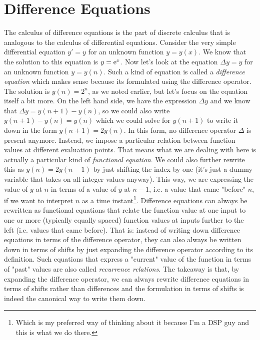 \section{Difference Equations}
The calculus of difference equations is the part of discrete calculus that is analogous to the calculus of differential equations. Consider the very simple differential equation $y' = y$ for an unknown function $y = y(x)$. We know that the solution to this equation is $y = \operatorname{\mathrm{e}}^x$. Now let's look at the equation $\Delta y = y$ for an unknown function $y = y(n)$. Such a kind of equation is called a \emph{difference equation} which makes sense because its formulated using the difference operator. The solution is $y(n) = 2^n$, as we noted earlier, but let's focus on the equation itself a bit more. On the left hand side, we have the expression $\Delta y$ and we know that $\Delta y = y(n+1) - y(n)$, so we could also write $y(n+1) - y(n) = y(n)$ which we could solve for $y(n+1)$ to write it down in the form $y(n+1) = 2 y(n)$. In this form, no difference operator $\Delta$ is present anymore. Instead, we impose a particular relation between function values at different evaluation points. That means what we are dealing with here is actually a particular kind of \emph{functional equation}.  We could also further rewrite this as $y(n) = 2 y(n-1)$ by just shifting the index by one (it's just a dummy variable that takes on all integer values anyway). This way, we are expressing the value of $y$ at $n$ in terms of a value of $y$ at $n-1$, i.e. a value that came "before" $n$, if we want to interpret $n$ as a time instant\footnote{Which is my preferred way of thinking about it because I'm a DSP guy and this is what we do there.}. Difference equations can always be rewritten as functional equations that relate the function value at one input to one or more (typically equally spaced) function values at inputs further to the left (i.e. values that came before). That is: instead of writing down difference equations in terms of the difference operator, they can also always be written down in terms of shifts by just expanding the difference operator according to its definition. Such equations that express a "current" value of the function in terms of "past" values are also called \emph{recurrence relations}. The takeaway is that, by expanding the difference operator, we can always rewrite difference equations in terms of shifts rather than differences and the formulation in terms of shifts is indeed the canonical way to write them down. 

